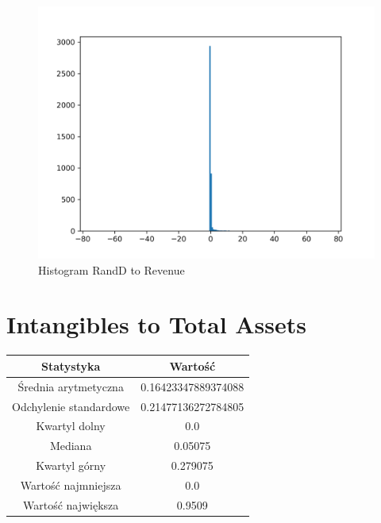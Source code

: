 \documentclass{article}
\begin{document}
\begin{figure}[h!]
    \includegraphics[width=\linewidth]{variables/R_D to Revenue.png}
    \caption{Histogram RandD to Revenue }
\end{figure}\section{ Intangibles to Total Assets }

\begin{center}
    \begin{tabular}{|c | c|} 
    \hline
    Statystyka & Wartość \\
    \hline\hline
    Średnia arytmetyczna & 0.16423347889374088 \\ 
    \hline
    Odchylenie standardowe & 0.21477136272784805 \\
    \hline
    Kwartyl dolny & 0.0 \\
    \hline
    Mediana & 0.05075 \\
    \hline
    Kwartyl górny & 0.279075 \\
    \hline
    Wartość najmniejsza & 0.0 \\
    \hline
    Wartość największa & 0.9509 \\
    \hline
   \end{tabular}
\end{center}
\end{document}
